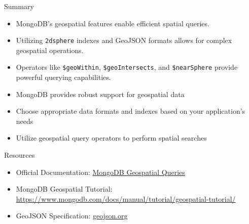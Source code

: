 \documentclass[aspectratio=169]{beamer}
\begin{document}

\begin{frame}{Summary}
	\begin{itemize}
		\item MongoDB's geospatial features enable efficient spatial queries.
		\item Utilizing \texttt{2dsphere} indexes and GeoJSON formats allows for complex geospatial operations.
		\item Operators like \texttt{\$geoWithin}, \texttt{\$geoIntersects}, and \texttt{\$nearSphere} provide powerful querying capabilities.
        \item MongoDB provides robust support for geospatial data
        \item Choose appropriate data formats and indexes based on your application's needs
        \item Utilize geospatial query operators to perform spatial searches
	\end{itemize}
\end{frame}

\begin{frame}{Resources}
  \begin{itemize}
    \item Official Documentation: \href{https://www.mongodb.com/docs/manual/geospatial-queries/}{MongoDB Geospatial Queries}
	\item MongoDB Geospatial Tutorial: \url{https://www.mongodb.com/docs/manual/tutorial/geospatial-tutorial/}
    \item GeoJSON Specification: \href{https://geojson.org/}{geojson.org}
  \end{itemize}
\end{frame}
\end{document}
